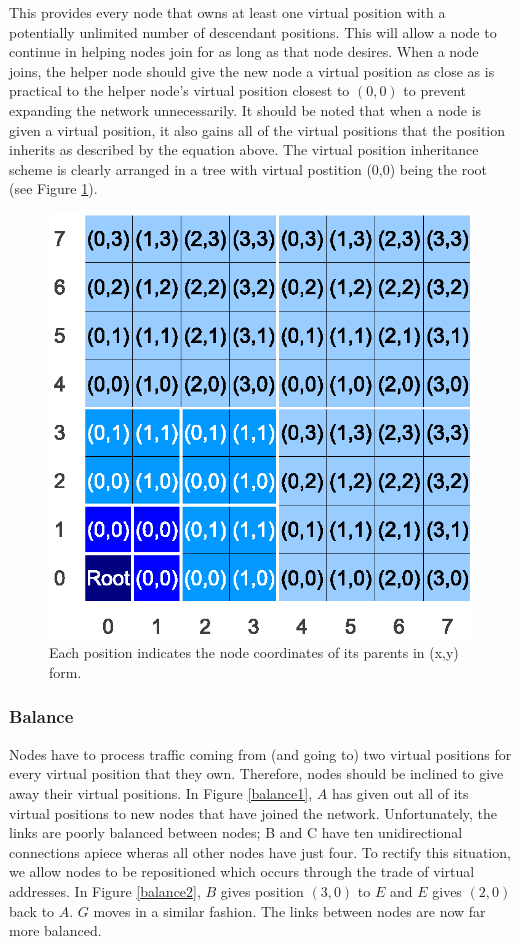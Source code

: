 \documentclass[ %
                    author={Luke Murray},
                supervisor={Dr. Simon Hollis},
                     title={Shadow Peer-to-Peer Networks},
                  subtitle={},
                    degree={MEng},
                      year={2013} ]{thesis}
\begin{document}
This provides every node that owns at least one virtual position with a potentially unlimited number of descendant positions. This will allow a node to continue in helping nodes join for as long as that node desires. When a node joins, the helper node should give the new node a virtual position as close as is practical to the helper node's virtual position closest to $(0, 0)$ to prevent expanding the network unnecessarily. It should be noted that when a node is given a virtual position, it also gains all of the virtual positions that the position inherits as described by the equation above. The virtual position inheritance scheme is clearly arranged in a tree with virtual postition (0,0) being the root (see Figure \ref{tree}).

\begin{figure}[h]
    \centering
    \includegraphics{diagrams/network_tree.eps}
    \caption{Each position indicates the node coordinates of its parents in (x,y) form.}
    \label{tree}
\end{figure}

\subsubsection{Balance}

Nodes have to process traffic coming from (and going to) two virtual positions for every virtual position that they own. Therefore, nodes should be inclined to give away their virtual positions. In Figure \ref{balance1}, $A$ has given out all of its virtual positions to new nodes that have joined the network. Unfortunately, the links are poorly balanced between nodes; B and C have ten unidirectional connections apiece wheras all other nodes have just four. To rectify this situation, we allow nodes to be repositioned which occurs through the trade of virtual addresses. In Figure \ref{balance2}, $B$ gives position $(3,0)$ to $E$ and $E$ gives $(2,0)$ back to $A$. $G$ moves in a similar fashion. The links between nodes are now far more balanced. 
\end{document}
